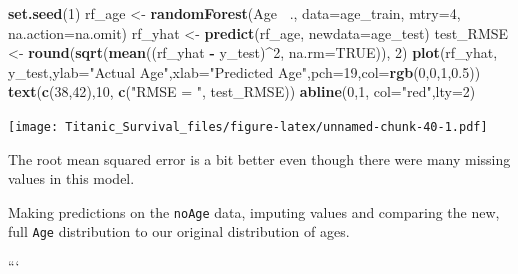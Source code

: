 \documentclass[]{article}
\newenvironment{Shaded}{\begin{snugshade}}{\end{snugshade}}
\newcommand{\KeywordTok}[1]{\textcolor[rgb]{0.13,0.29,0.53}{\textbf{#1}}}
\newcommand{\DataTypeTok}[1]{\textcolor[rgb]{0.13,0.29,0.53}{#1}}
\newcommand{\DecValTok}[1]{\textcolor[rgb]{0.00,0.00,0.81}{#1}}
\newcommand{\FloatTok}[1]{\textcolor[rgb]{0.00,0.00,0.81}{#1}}
\newcommand{\StringTok}[1]{\textcolor[rgb]{0.31,0.60,0.02}{#1}}
\newcommand{\OtherTok}[1]{\textcolor[rgb]{0.56,0.35,0.01}{#1}}
\newcommand{\OperatorTok}[1]{\textcolor[rgb]{0.81,0.36,0.00}{\textbf{#1}}}
\newcommand{\NormalTok}[1]{#1}
\begin{document}
\begin{Shaded}
\begin{Highlighting}[]
\KeywordTok{set.seed}\NormalTok{(}\DecValTok{1}\NormalTok{)}
\NormalTok{rf_age <-}\StringTok{ }\KeywordTok{randomForest}\NormalTok{(Age }\OperatorTok{~}\NormalTok{., }\DataTypeTok{data=}\NormalTok{age_train, }\DataTypeTok{mtry=}\DecValTok{4}\NormalTok{, }\DataTypeTok{na.action=}\NormalTok{na.omit)}
\NormalTok{rf_yhat <-}\StringTok{ }\KeywordTok{predict}\NormalTok{(rf_age, }\DataTypeTok{newdata=}\NormalTok{age_test)}
\NormalTok{test_RMSE <-}\StringTok{ }\KeywordTok{round}\NormalTok{(}\KeywordTok{sqrt}\NormalTok{(}\KeywordTok{mean}\NormalTok{((rf_yhat }\OperatorTok{-}\StringTok{ }\NormalTok{y_test)}\OperatorTok{^}\DecValTok{2}\NormalTok{, }\DataTypeTok{na.rm=}\OtherTok{TRUE}\NormalTok{)), }\DecValTok{2}\NormalTok{)}
\KeywordTok{plot}\NormalTok{(rf_yhat, y_test,}\DataTypeTok{ylab=}\StringTok{"Actual Age"}\NormalTok{,}\DataTypeTok{xlab=}\StringTok{"Predicted Age"}\NormalTok{,}\DataTypeTok{pch=}\DecValTok{19}\NormalTok{,}\DataTypeTok{col=}\KeywordTok{rgb}\NormalTok{(}\DecValTok{0}\NormalTok{,}\DecValTok{0}\NormalTok{,}\DecValTok{1}\NormalTok{,}\FloatTok{0.5}\NormalTok{))}
\KeywordTok{text}\NormalTok{(}\KeywordTok{c}\NormalTok{(}\DecValTok{38}\NormalTok{,}\DecValTok{42}\NormalTok{),}\DecValTok{10}\NormalTok{, }\KeywordTok{c}\NormalTok{(}\StringTok{"RMSE = "}\NormalTok{, test_RMSE))}
\KeywordTok{abline}\NormalTok{(}\DecValTok{0}\NormalTok{,}\DecValTok{1}\NormalTok{, }\DataTypeTok{col=}\StringTok{"red"}\NormalTok{,}\DataTypeTok{lty=}\DecValTok{2}\NormalTok{)}
\end{Highlighting}
\end{Shaded}

\texttt{[image: Titanic\_Survival\_files/figure-latex/unnamed-chunk-40-1.pdf]}

The root mean squared error is a bit better even though there were many
missing values in this model.

Making predictions on the \texttt{noAge} data, imputing values and
comparing the new, full \texttt{Age} distribution to our original
distribution of ages.

```
\end{document}
